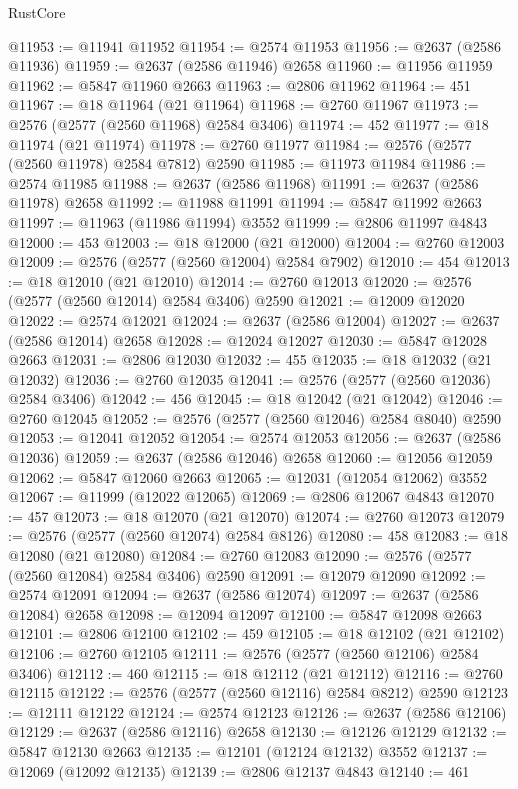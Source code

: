 \begin{lexlean}{RustCore}
\begin{coremodule}
@11953 := @11941 @11952
@11954 := @2574 @11953
@11956 := @2637 (@2586 @11936)
@11959 := @2637 (@2586 @11946) @2658
@11960 := @11956 @11959
@11962 := @5847 @11960 @2663
@11963 := @2806 @11962
@11964 := 451
@11967 := @18 @11964 (@21 @11964)
@11968 := @2760 @11967
@11973 := @2576 (@2577 (@2560 @11968) @2584 @3406)
@11974 := 452
@11977 := @18 @11974 (@21 @11974)
@11978 := @2760 @11977
@11984 := @2576 (@2577 (@2560 @11978) @2584 @7812) @2590
@11985 := @11973 @11984
@11986 := @2574 @11985
@11988 := @2637 (@2586 @11968)
@11991 := @2637 (@2586 @11978) @2658
@11992 := @11988 @11991
@11994 := @5847 @11992 @2663
@11997 := @11963 (@11986 @11994) @3552
@11999 := @2806 @11997 @4843
@12000 := 453
@12003 := @18 @12000 (@21 @12000)
@12004 := @2760 @12003
@12009 := @2576 (@2577 (@2560 @12004) @2584 @7902)
@12010 := 454
@12013 := @18 @12010 (@21 @12010)
@12014 := @2760 @12013
@12020 := @2576 (@2577 (@2560 @12014) @2584 @3406) @2590
@12021 := @12009 @12020
@12022 := @2574 @12021
@12024 := @2637 (@2586 @12004)
@12027 := @2637 (@2586 @12014) @2658
@12028 := @12024 @12027
@12030 := @5847 @12028 @2663
@12031 := @2806 @12030
@12032 := 455
@12035 := @18 @12032 (@21 @12032)
@12036 := @2760 @12035
@12041 := @2576 (@2577 (@2560 @12036) @2584 @3406)
@12042 := 456
@12045 := @18 @12042 (@21 @12042)
@12046 := @2760 @12045
@12052 := @2576 (@2577 (@2560 @12046) @2584 @8040) @2590
@12053 := @12041 @12052
@12054 := @2574 @12053
@12056 := @2637 (@2586 @12036)
@12059 := @2637 (@2586 @12046) @2658
@12060 := @12056 @12059
@12062 := @5847 @12060 @2663
@12065 := @12031 (@12054 @12062) @3552
@12067 := @11999 (@12022 @12065)
@12069 := @2806 @12067 @4843
@12070 := 457
@12073 := @18 @12070 (@21 @12070)
@12074 := @2760 @12073
@12079 := @2576 (@2577 (@2560 @12074) @2584 @8126)
@12080 := 458
@12083 := @18 @12080 (@21 @12080)
@12084 := @2760 @12083
@12090 := @2576 (@2577 (@2560 @12084) @2584 @3406) @2590
@12091 := @12079 @12090
@12092 := @2574 @12091
@12094 := @2637 (@2586 @12074)
@12097 := @2637 (@2586 @12084) @2658
@12098 := @12094 @12097
@12100 := @5847 @12098 @2663
@12101 := @2806 @12100
@12102 := 459
@12105 := @18 @12102 (@21 @12102)
@12106 := @2760 @12105
@12111 := @2576 (@2577 (@2560 @12106) @2584 @3406)
@12112 := 460
@12115 := @18 @12112 (@21 @12112)
@12116 := @2760 @12115
@12122 := @2576 (@2577 (@2560 @12116) @2584 @8212) @2590
@12123 := @12111 @12122
@12124 := @2574 @12123
@12126 := @2637 (@2586 @12106)
@12129 := @2637 (@2586 @12116) @2658
@12130 := @12126 @12129
@12132 := @5847 @12130 @2663
@12135 := @12101 (@12124 @12132) @3552
@12137 := @12069 (@12092 @12135)
@12139 := @2806 @12137 @4843
@12140 := 461

\end{coremodule}
\end{lexlean}
